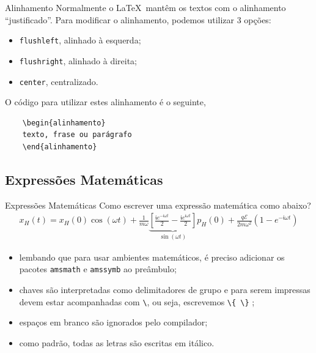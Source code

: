 \documentclass[c]{beamer}
\renewcommand{\r}{\right}
\renewcommand{\l}{\left}
\newcommand*{\ii}{\mathfrak{i}}
\begin{document}
{\begin{frame}[fragile]{\sc Alinhamento}
	Normalmente o \LaTeX \ mantêm os textos com o alinhamento ``justificado''. 
	Para {\color{blue} modificar o alinhamento}, podemos utilizar 3 opções:
	\begin{itemize}
		\setlength\itemsep{0.3cm}
		\item \verb|flushleft|, alinhado à esquerda;
		\item \verb|flushright|, alinhado à direita;
		\item \verb|center|, centralizado.
	\end{itemize}
	O {\color{blue} código} para utilizar estes alinhamento é o seguinte,
	
	\begin{verbatim}
	\begin{alinhamento}
	texto, frase ou parágrafo
	\end{alinhamento}
	\end{verbatim}
\end{frame}

\subsection{Expressões Matemáticas}


\begin{frame}[fragile]{\sc Expressões Matemáticas}
	Como escrever uma expressão matemática como abaixo? 
	\begin{align}
	x_H(t)=x_H(0)\cos\l(\omega t\r)+\frac{1}{m\omega}\underbrace{\l[
		\frac{\ii e^{-\ii\omega t}}{2}-\frac{\ii e^{\ii\omega t}}{2}
		\r]}_{\sin\l(\omega t\r)}
	p_H(0)
	+\frac{q\mathcal{E}}{2m\omega^2}\l(1-e^{-\ii\omega t}\r)
	\nonumber
	\end{align}
	\begin{itemize}
		\setlength\itemsep{0.3cm}
		\item lembando que para usar {\color{blue} ambientes matemáticos}, é preciso {\color{blue} adicionar} os 
		{\color{blue} pacotes} \verb|amsmath| e \verb|amssymb| ao preâmbulo;
	   \item {\color{blue} chaves} são interpretadas como {\color{blue} delimitadores de grupo}
	    e para serem impressas devem estar acompanhadas com \verb|\|,
	   ou seja, escrevemos \verb|\{ \}| ;  
	   \item espaços em branco são ignorados pelo compilador;
	   \item como padrão, todas as letras são escritas em itálico.
	\end{itemize}
\end{frame}

}
\end{document}
